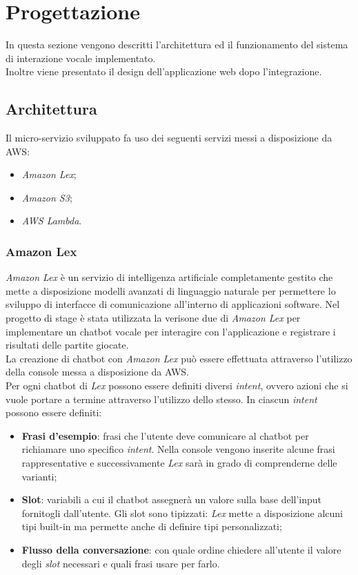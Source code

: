 \section{Progettazione}
In questa sezione vengono descritti l'architettura ed il funzionamento del sistema di interazione vocale implementato. \\ 
Inoltre viene presentato il design dell'applicazione web dopo l'integrazione.
	\subsection{Architettura}
	Il micro-servizio sviluppato fa uso dei seguenti servizi messi a disposizione da \gls{AWS}:
	\begin{itemize}
		\item \emph{Amazon Lex};
		\item \emph{Amazon S3};
		\item \emph{AWS Lambda}.
	\end{itemize}
		\subsubsection{Amazon Lex}
		\emph{Amazon Lex} è un servizio di intelligenza artificiale completamente gestito che mette a disposizione 
		modelli avanzati di linguaggio naturale per permettere lo sviluppo di interfacce di comunicazione all'interno 
		di applicazioni software. Nel progetto di stage è stata utilizzata la verisone due di \emph{Amazon Lex} per 
		implementare un \gls{chatbot} vocale per interagire con l'applicazione e registrare i risultati delle partite 
		giocate. \\
		
		\noindent La creazione di \gls{chatbot} con \emph{Amazon Lex} può essere effettuata attraverso l'utilizzo della console messa a disposizione da \gls{AWS}. \\
		Per ogni \gls{chatbot} di \emph{Lex} possono essere definiti diversi \emph{intent}, ovvero azioni che si
		vuole portare a termine attraverso l'utilizzo dello stesso. In ciascun \emph{intent} possono essere definiti:
		\begin{itemize}
			\item \textbf{Frasi d'esempio}: frasi che l'utente deve comunicare al \gls{chatbot} per richiamare uno
			specifico \emph{intent}. Nella console vengono inserite alcune frasi rappresentative e successivamente \emph{Lex} sarà in grado di comprenderne delle varianti; 
			\item \textbf{Slot}: variabili a cui il \gls{chatbot} assegnerà un valore sulla base
			dell'input fornitogli dall'utente. Gli slot sono tipizzati:	\emph{Lex} mette a disposizione alcuni tipi built-in ma permette anche di definire tipi personalizzati;
			\item \textbf{Flusso della conversazione}: con quale ordine chiedere all'utente il valore degli \emph{slot} necessari e quali frasi usare per farlo.		
		\end{itemize}
		
